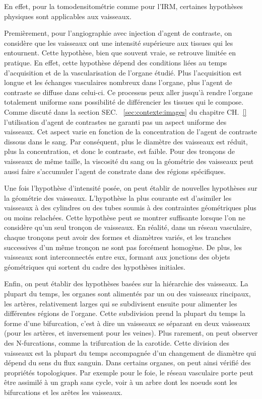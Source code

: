 En effet, pour la tomodensitométrie comme pour l'IRM, certaines hypothèses physiques sont applicables aux vaisseaux.

Premièrement, pour l'angiographie avec injection d'agent de contraste, on considère que les vaisseaux ont une intensité supérieure aux tissues qui les entournent. Cette hypothèse, bien que souvent vraie, se retrouve limitée en pratique. En effet, cette hypothèse dépend des conditions liées au temps d'acquisition et de la vascularisation de l'organe étudié. Plus l'acquisition est longue et les échanges vasculaires nombreux dans l'organe, plus l'agent de contraste se diffuse dans celui-ci. Ce processus peux aller jusqu'à rendre l'organe totalement uniforme sans possibilité de différencier les tissues qui le compose. Comme discuté dans la section SEC. ~\ref{sec:contexte:images} du chapitre CH.~\ref{} l'utilisation d'agent de contrastes ne garanti pas un aspect uniforme des vaisseaux. Cet aspect varie en fonction de la concentration de l'agent de contraste dissous dans le sang. Par conséquent, plus le diamètre des vaisseaux est réduit, plus la concentration, et donc le contraste, est faible. Pour des tronçons de vaisseaux de même taille, la viscosité du sang ou la géométrie des vaisseaux peut aussi faire s'accumuler l'agent de constrate dans des régions spécifiques.

Une fois l'hypothèse d'intensité posée, on peut établir de nouvelles hypothèses sur la géométrie des vaisseaux. L'hypothèse la plus courante est d'asimiler les vaisseaux à des cylindres ou des tubes soumis à des contraintes géométriques plus ou moins relachées. Cette hypothèse peut se montrer suffisante lorsque l'on ne considère qu'un seul tronçon de vaisseaux. En réalité, dans un réseau vasculaire, chaque tronçons peut avoir des formes et diamètres variés, et les tranches successives d'un même tronçon ne sont pas forcément homogène. De plus, les vaisseaux sont interconnectés entre eux, formant aux jonctions des objets géométriques qui sortent du cadre des hypothèses initiales.

Enfin, on peut établir des hypothèses basées sur la hiérarchie des vaisseaux. La plupart du temps, les organes sont alimentés par un ou des vaisseaux rincipaux, les artères, relativement larges qui se subdivisent ensuite pour alimenter les différentes régions de l'organe. Cette subdivision prend la plupart du temps la forme d'une bifurcation, c'est à dire un vaisseaux se séparant en deux vaisseaux (pour les artères, et inversement pour les veines). Plus rarement, on peut observer des N-furcations, comme la trifurcation de la carotide. Cette division des vaisseaux est la plupart du temps accompagnée d'un changement de diamètre qui dépend du sens du flux sanguin. Dans certains organes, on peut ainsi vérifié des propriétés topologiques. Par exemple pour le foie, le réseau vasculaire porte peut être assimilé à un graph sans cycle, voir à un arbre dont les noeuds sont les bifurcations et les arêtes les vaisseaux.

